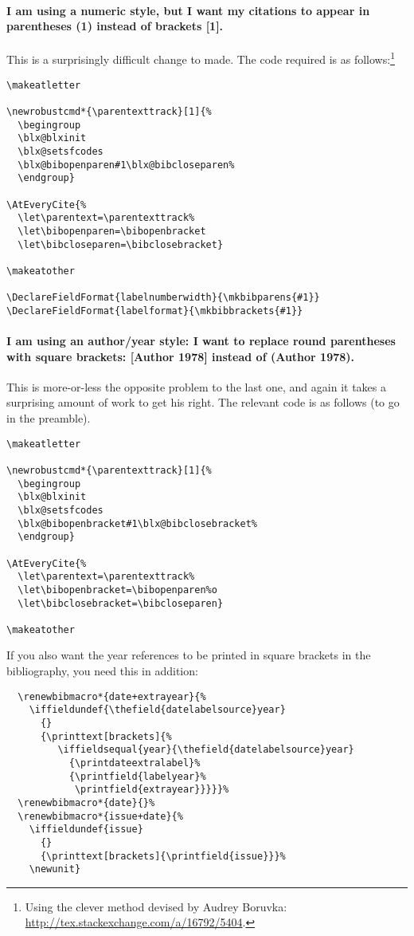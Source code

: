 \paragraph{I am using a numeric style, but I want my citations to appear in parentheses (1) instead of brackets [1].}
\begin{marginfigure}[8ex]
\vspace{3pt}%
\caption{Brackets replaced by parentheses}\label{punctcite7}
\end{marginfigure}
 This is a surprisingly difficult change to made. The code required is as follows:\footnote{Using the clever method devised by Audrey Boruvka: \url{http://tex.stackexchange.com/a/16792/5404}.}

\begin{Verbatim}
\makeatletter

\newrobustcmd*{\parentexttrack}[1]{%
  \begingroup
  \blx@blxinit
  \blx@setsfcodes
  \blx@bibopenparen#1\blx@bibcloseparen%
  \endgroup}

\AtEveryCite{%
  \let\parentext=\parentexttrack%
  \let\bibopenparen=\bibopenbracket
  \let\bibcloseparen=\bibclosebracket}

\makeatother

\DeclareFieldFormat{labelnumberwidth}{\mkbibparens{#1}}
\DeclareFieldFormat{labelformat}{\mkbibbrackets{#1}}
\end{Verbatim}

\paragraph{I am using an author/year style: I want to replace round parentheses with square brackets: [Author 1978] instead of (Author 1978).} This is more-or-less the opposite problem to the last one, and again it takes a surprising amount of work to get his right. The relevant code is as follows (to go in the preamble).
\begin{Verbatim}
\makeatletter

\newrobustcmd*{\parentexttrack}[1]{%
  \begingroup
  \blx@blxinit
  \blx@setsfcodes
  \blx@bibopenbracket#1\blx@bibclosebracket%
  \endgroup}

\AtEveryCite{%
  \let\parentext=\parentexttrack%
  \let\bibopenbracket=\bibopenparen%o
  \let\bibclosebracket=\bibcloseparen}

\makeatother
\end{Verbatim}

If you also want the year references to be printed in square brackets in the bibliography, you need this in addition:
\begin{Verbatim}
  \renewbibmacro*{date+extrayear}{%
    \iffieldundef{\thefield{datelabelsource}year}
      {}
      {\printtext[brackets]{%
         \iffieldsequal{year}{\thefield{datelabelsource}year}
           {\printdateextralabel}%
           {\printfield{labelyear}%
            \printfield{extrayear}}}}}%
  \renewbibmacro*{date}{}%
  \renewbibmacro*{issue+date}{%
    \iffieldundef{issue}
      {}
      {\printtext[brackets]{\printfield{issue}}}%
    \newunit}
\end{Verbatim}

